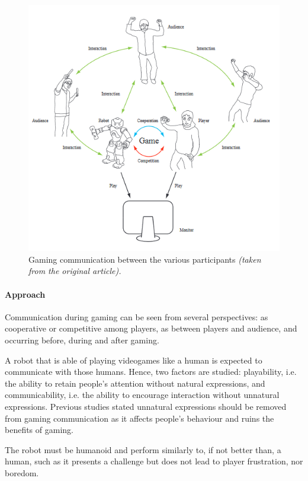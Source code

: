 \documentclass[runningheads]{llncs}
\begin{document}
\begin{figure}
    \centering
    \includegraphics[scale = 0.85]{Robot.png}
    \caption{Gaming communication between the various participants \textit{(taken from the original article).}}
    \label{fig:robot}
\end{figure}

\paragraph{Approach} Communication during gaming can be seen from several perspectives: as cooperative or competitive among players, as between players and audience, and occurring before, during and after gaming.
\par A robot that is able of playing videogames like a human is expected to communicate with those humans. Hence, two factors are studied: playability, i.e. the ability to retain people's attention without natural expressions, and communicability, i.e. the ability to encourage interaction without unnatural expressions. Previous studies stated unnatural expressions should be removed from gaming communication as it affects people's behaviour and ruins the benefits of gaming.
\par The robot must be humanoid and perform similarly to, if not better than, a human, such as it presents a challenge but does not lead to player frustration, nor boredom.
\end{document}
